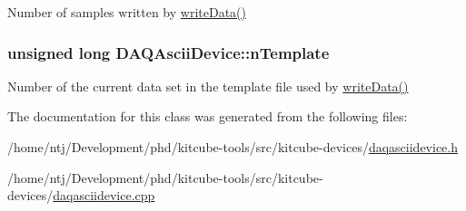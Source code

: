 Number of samples written by \hyperlink{classDAQDevice_acdc9d3765b1dfd845f99ec9c93071811}{write\-Data()} \hypertarget{classDAQAsciiDevice_a7885676e316cf2533707297f30f96644}{
\subsubsection[{n\-Template}]{\setlength{\rightskip}{0pt plus 5cm}unsigned long D\-A\-Q\-Ascii\-Device\-::n\-Template\hspace{0.3cm}{\ttfamily [protected]}}}\label{classDAQAsciiDevice_a7885676e316cf2533707297f30f96644}
Number of the current data set in the template file used by \hyperlink{classDAQDevice_acdc9d3765b1dfd845f99ec9c93071811}{write\-Data()} 

The documentation for this class was generated from the following files\-:\begin{DoxyCompactItemize}
\item 
/home/ntj/\-Development/phd/kitcube-\/tools/src/kitcube-\/devices/\hyperlink{daqasciidevice_8h}{daqasciidevice.\-h}\item 
/home/ntj/\-Development/phd/kitcube-\/tools/src/kitcube-\/devices/\hyperlink{daqasciidevice_8cpp}{daqasciidevice.\-cpp}\end{DoxyCompactItemize}
